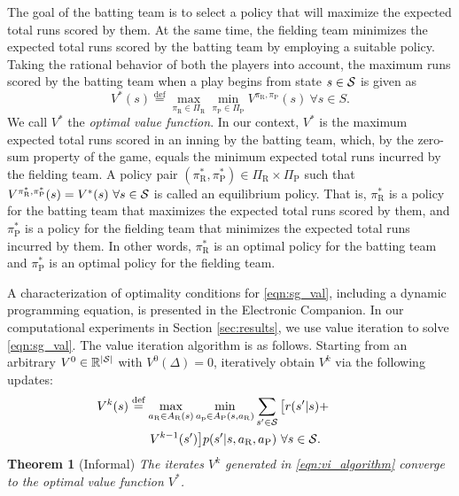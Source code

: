 \documentclass[opre,dblanonrev]{informs4}
\newcommand{\defeq}{\stackrel{\text{def}}{=}}
\newcommand{\abs}[1]{\left\lvert#1\right\rvert}
\begin{document}
    The goal of the batting team is to select a policy that will maximize the expected total runs scored by them. At the same time, the fielding team minimizes the expected total runs scored by the batting team by employing a suitable policy. Taking the rational behavior of both the players into account, the maximum runs scored by the batting team when a play begins from state $s \in {\cal S}$ is given as 
   \begin{equation}
        \label{eqn:sg_val}
        V^*(s) \defeq \max_{\pi_\text{R} \in \Pi_\text{R}}\min_{\pi_\text{P} \in \Pi_\text{P}}V^{\pi_\text{R},\pi_\text{P}}(s) \ \forall s \in S.
   \end{equation}
   We call $V^*$ the \emph{optimal value function}. In our context, $V^*$ is the maximum expected total runs scored in an inning by the batting team, which, by the zero-sum property of the game, equals the minimum expected total runs incurred by the fielding team. A policy pair $(\pi_\text{R}^*,\pi_\text{P}^*) \in \Pi_\text{R} \times \Pi_\text{P}$ such that $V^{\pi_\text{R}^*,\pi_\text{P}^*}(s) = V^*(s) \ \forall s \in {\cal S}$ is called an equilibrium policy. That is, $\pi_\text{R}^*$ is a policy for the batting team that maximizes the expected total runs scored by them, and $\pi_\text{P}^*$ is a policy for the fielding team that minimizes the expected total runs incurred by them. In other words, $\pi_\text{R}^*$ is an optimal policy for the batting team and $\pi_\text{P}^*$ is an optimal policy for the fielding team. 

   A characterization of optimality conditions for \eqref{eqn:sg_val}, including a dynamic programming equation, is presented in the Electronic Companion. In our computational experiments in Section \ref{sec:results}, we use value iteration to solve \eqref{eqn:sg_val}. The value iteration algorithm is as follows. Starting from an arbitrary $V^0 \in \mathbb{R}^{\abs{\cal S}}$ with $V^0(\Delta) = 0$, iteratively obtain $V^k$ via the following updates:
   \begin{align}
     \label{eqn:vi_algorithm}
     \hspace*{-10mm}
     \begin{split}
       &V^k(s) \defeq \max_{a_\text{R} \in A_\text{R}(s)} \min_{a_\text{p} \in A_\text{P}(s,a_\text{R})} \sum_{s' \in \mathcal{S}}\big[r(s'|s) + \\
       & \hspace{15mm} V^{k-1}(s')\big] p(s'|s,a_\text{R},a_\text{P})   \ \forall s \in \mathcal{S}.
     \end{split}
   \end{align}
   {\bf Theorem 1} (Informal) {\it 
   The iterates $V^k$ generated in \eqref{eqn:vi_algorithm} converge to the optimal value function $V^*$.}
   
\end{document}
